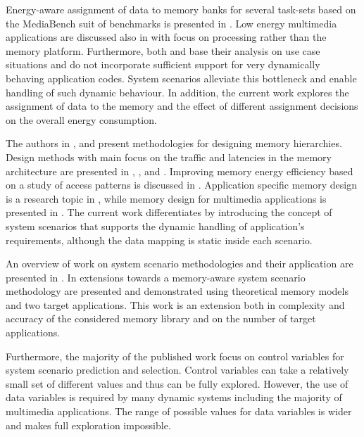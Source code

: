 \documentclass[prodmode,acmtodaes]{acmsmall}
\begin{document}
Energy-aware assignment of data to memory banks for several task-sets based on the MediaBench suit of benchmarks is presented in \cite{Mar03}. 
Low energy multimedia applications are discussed also in \cite{Chu02} with focus on processing rather than the memory platform. 
Furthermore, both \cite{Mar03} and \cite{Chu02} base their analysis on use case situations and do not incorporate sufficient support for very dynamically behaving application codes. 
System scenarios alleviate this bottleneck and enable handling of such dynamic behaviour. 
In addition, the current work explores the assignment of data to the memory and the effect of different assignment decisions on the overall energy consumption.

The authors in \cite{abraham1999automatic}, \cite{jacob1996analytical} and \cite{li1999hardware} present methodologies for designing memory hierarchies.
Design methods with main focus on the traffic and latencies in the memory architecture are presented in \cite{chen1999loop}, \cite{grun2000mist}, \cite{jantsch1994hardware} and \cite{passes1995multi}.
Improving memory energy efficiency based on a study of access patterns is discussed in \cite{kandemir2001improving}.
Application specific memory design is a research topic in \cite{schmit1997synthesis}, while memory design for multimedia applications is presented in \cite{oshima1997high}.
The current work differentiates by introducing the concept of system scenarios that supports the dynamic handling of application's requirements, although the data mapping is static inside each scenario. 

An overview of work on system scenario methodologies and their application are presented in \cite{Gheorghita2007}. 
In \cite{Fil12} extensions towards a memory-aware system scenario methodology are presented and demonstrated using theoretical memory models and two target applications. 
This work is an extension both in complexity and accuracy of the considered memory library and on the number of target applications. 

Furthermore, the majority of the published work focus on control variables for system scenario prediction and selection. 
Control variables can take a relatively small set of different values and thus can be fully explored. However, the use of data variables \cite{Elena2010} is required by many dynamic systems including the majority of multimedia applications. 
The range of possible values for data variables is wider and makes full exploration impossible. 
\end{document}
